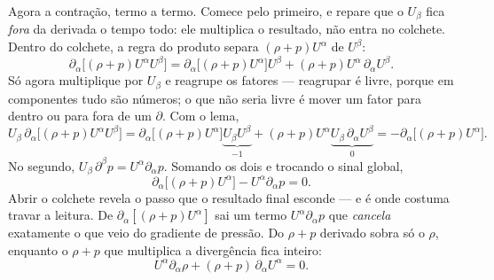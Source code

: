 \documentclass[12pt,a4paper,oneside]{book}
\theoremstyle{rgplain}
\theoremstyle{rgremark}
\begin{document}
Agora a contração, termo a termo. Comece pelo primeiro, e repare que o
$U_\beta$ fica \emph{fora} da derivada o tempo todo: ele multiplica o
resultado, não entra no colchete. Dentro do colchete, a regra do produto
separa $(\rho+p)U^\alpha$ de $U^\beta$:
\[
  \partial_\alpha\bigl[(\rho+p)U^\alpha U^\beta\bigr]
  =\partial_\alpha\bigl[(\rho+p)U^\alpha\bigr]U^\beta
   +(\rho+p)U^\alpha\,\partial_\alpha U^\beta .
\]
Só agora multiplique por $U_\beta$ e reagrupe os fatores --- reagrupar é
livre, porque em componentes tudo são números; o que não seria livre é mover
um fator para dentro ou para fora de um $\partial$. Com o lema,
\[
  U_\beta\,\partial_\alpha\bigl[(\rho+p)U^\alpha U^\beta\bigr]
  =\partial_\alpha\bigl[(\rho+p)U^\alpha\bigr]
   \underbrace{U_\beta U^\beta}_{-1}
   +(\rho+p)U^\alpha
   \underbrace{U_\beta\,\partial_\alpha U^\beta}_{0}
  =-\partial_\alpha\bigl[(\rho+p)U^\alpha\bigr] .
\]
No segundo, $U_\beta\,\partial^\beta p=U^\alpha\partial_\alpha p$. Somando os
dois e trocando o sinal global,
\[
  \partial_\alpha\bigl[(\rho+p)U^\alpha\bigr]-U^\alpha\partial_\alpha p=0 .
\]
Abrir o colchete revela o passo que o resultado final esconde --- e é onde
costuma travar a leitura. De $\partial_\alpha[(\rho+p)U^\alpha]$ sai um termo
$U^\alpha\partial_\alpha p$ que \emph{cancela} exatamente o que veio do
gradiente de pressão. Do $\rho+p$ derivado sobra só o $\rho$, enquanto o
$\rho+p$ que multiplica a divergência fica inteiro:
\begin{equation}
  U^\alpha\partial_\alpha\rho+(\rho+p)\,\partial_\alpha U^\alpha=0 .
  \label{eq:energia-fluido}
\end{equation}
\end{document}
